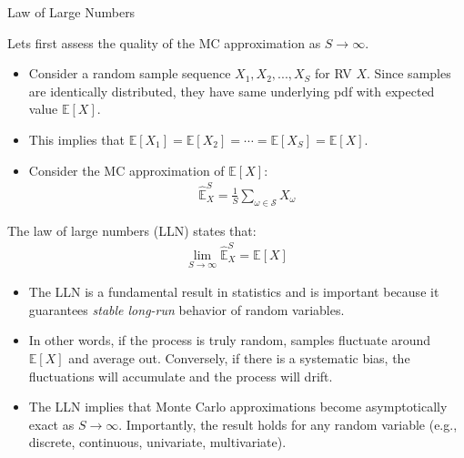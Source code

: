 \documentclass[9pt]{beamer}
\begin{document}
%
\begin{frame}{Law of Large Numbers}

Lets first assess the quality of the MC approximation as $S\to \infty$. 
\begin{itemize}
\item Consider a random sample sequence $X_1,X_2,...,X_S$ for RV $X$. Since samples are identically distributed, they have same underlying pdf with expected value $\mathbb{E}[X]$. 
\item This implies that $\mathbb{E}[X_1]=\mathbb{E}[X_2]=\cdots=\mathbb{E}[X_S]=\mathbb{E}[X]$. 
\item Consider the MC approximation of $\mathbb{E}[X]$:
\begin{align*}
\hat{\mathbb{E}}_X^S=\frac{1}{S}\sum_{\omega \in \mathcal{S}}X_\omega
\end{align*}
\end{itemize}
\begin{block}{}
The law of large numbers (LLN) states that:
\begin{align*}
\lim_{S\to \infty}\hat{\mathbb{E}}_X^S=\mathbb{E}[X]
\end{align*}
\end{block}
\begin{itemize}
\item The LLN is a fundamental result in statistics and is important because it guarantees {\em stable long-run} behavior of random variables.  

\item In other words, if the process is truly random, samples fluctuate around $\mathbb{E}[X]$ and average out.  Conversely, if there is a systematic bias, the fluctuations will accumulate and the process will drift. 

\item The LLN implies that Monte Carlo approximations become asymptotically exact as $S\to \infty$. Importantly, the result holds for any random variable (e.g., discrete, continuous, univariate, multivariate). 
\end{itemize}

\end{frame}
\end{document}
